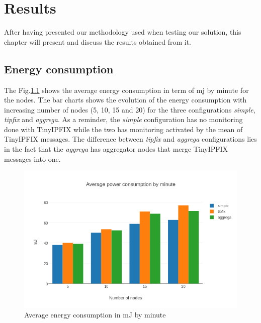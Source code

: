 \chapter{Results}

After having presented our methodology used when testing our solution, this chapter will present and discuss the results obtained from it.

\section{Energy consumption}

The Fig.\ref{fig:average_energy} shows the average energy consumption in term of \acrfull{mj} by minute for the nodes. The bar charts shows the evolution of the energy consumption with increasing number of nodes (5, 10, 15 and 20) for the three configurations \textit{simple}, \textit{tipfix} and \textit{aggrega}. As a reminder, the \textit{simple} configuration has no monitoring done with TinyIPFIX while the two has monitoring activated by the mean of TinyIPFIX messages. The difference between \textit{tipfix} and \textit{aggrega} configurations lies in the fact that the \textit{aggrega} has aggregator nodes that merge TinyIPFIX messages into one. \\

\begin{figure}[h]
  \centering
  \includegraphics[width=\textwidth]{res/average_energy.png}
  \caption{Average energy consumption in mJ by minute}
  \label{fig:average_energy}
\end{figure}

